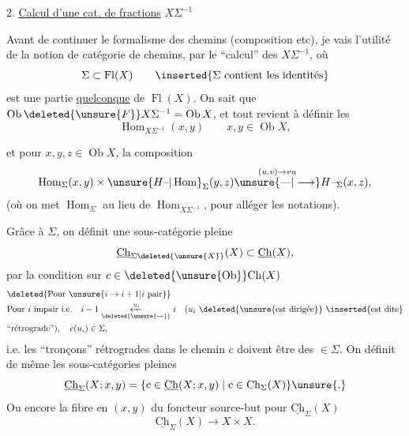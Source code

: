 2.  \uline{Calcul d'une cat. de fractions} $X\Sigma^{-1}$

Avant de continuer le formalisme des chemins (composition etc), je vais  l'utilité de la notion de  catégorie de chemins, par le ``calcul'' des $X\Sigma^{-1}$, où
\[
\Sigma\subset\operatorname{Fl}(X)\qquad\inserted{\Sigma\ \text{contient les identités}}
\]
est une partie  \uline{quelconque} de $\operatorname{Fl}(X)$. On sait que $\operatorname{Ob}\deleted{\unsure{F}}X\Sigma^{-1}=\operatorname{Ob}X$, et tout revient à définir 
 les
\[
\operatorname{Hom}_{X\Sigma^{-1}}(x,y)\qquad x,y\in\operatorname{Ob}X,
\]

et pour $x,y,z\in\operatorname{Ob}X$, la composition
\[
\operatorname{Hom}_\Sigma(x,y)\times\unsure{H\text{--}|\operatorname{Hom}}_\Sigma(y,z)\overset{(u,v)\to vu}{\unsure{\text{---}|\longrightarrow}}{H\text{--}}_{\Sigma}(x,z),
\]
(où on met $\operatorname{Hom}_\Sigma$ au lieu de $\operatorname{Hom}_{X\Sigma^{-1}}$, pour alléger les notations).

 Grâce à $\Sigma$, on définit une sous-catégorie pleine
\[
\underline{\mathrm{Ch}}_{\Sigma\deleted{\unsure{X}}}(X)\subset\underline{\mathrm{Ch}}(X),
\]
par la condition sur $c\in\deleted{\unsure{\operatorname{Ob}}}\mathrm{Ch}(X)$
\[
\begin{aligned}
&\deleted{\text{Pour }\unsure{i\to i+1|i\ \text{pair}}}\\
&\text{Pour }i\text{ impair i.e.}\quad i-1\mathrel{\underset{\deleted{\unsure{\to}}}{\xleftarrow{u_i}}}i\quad (u_i\ \deleted{\unsure{\text{est dirigée}}}\ \inserted{\text{est dite}}\\
&\text{``rétrograde''}),\quad c(u_i)\in\Sigma,
\end{aligned}
\]
i.e. les   ``tronçons'' rétrogrades dans le chemin $c$ doivent être des $\in\Sigma$. On définit de même les sous-catégories pleines
\[
\underline{\mathrm{Ch}}_\Sigma(X;x,y)=\{c\in\underline{\mathrm{Ch}}(X;x,y)\mid c\in\mathrm{Ch}_\Sigma(X)\}\unsure{.}
\]
Ou encore la fibre en $(x,y)$ du foncteur source-but pour $\underline{\mathrm{Ch}}_\Sigma(X)$
\[
\underline{\mathrm{Ch}}_\Sigma(X)\longrightarrow X\times X.
\]

